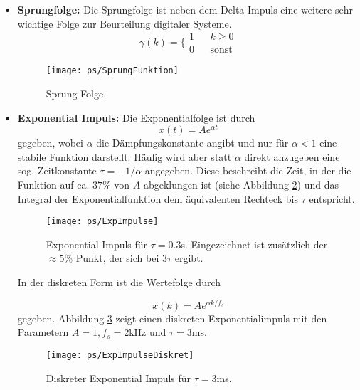 \begin{itemize}
{}
\item{{\bf Sprungfolge:} Die Sprungfolge ist neben dem Delta-Impuls eine weitere sehr wichtige
    Folge zur Beurteilung digitaler Systeme.
    \begin{equation}\label{eq:Def:Sprungfolge}
        \gamma(k) = \bigg\{ \begin{array}{lcc}
        1 & & k \geq 0\\
        0 & & \mbox{sonst}
        \end{array}
    \end{equation}
\begin{figure}[h]
\begin{center}
\texttt{[image: ps/SprungFunktion]}
\caption{\label{pic:SprungFunktion} Sprung-Folge.}
\end{center}
\end{figure}
}
\item{{\bf Exponential Impuls:} Die Exponentialfolge ist durch
    \begin{equation}
        x(t) = A e^{\alpha t}
    \end{equation}
    gegeben, wobei $\alpha$ die Dämpfungskonstante angibt und nur für $\alpha < 1$ eine stabile Funktion darstellt.
    Häufig wird aber statt $\alpha$ direkt anzugeben eine sog. Zeitkonstante $\tau = -1 / \alpha$ angegeben.
    Diese beschreibt die Zeit, in der die Funktion auf ca. $37$\% von $A$ abgeklungen ist (siehe
    Abbildung \ref{pic:ExpImpulse}) und das Integral der Exponentialfunktion dem äquivalenten Rechteck bis $\tau$ entspricht.
    \begin{figure}[h]
    \begin{center}
    \texttt{[image: ps/ExpImpulse]}
    \caption{\label{pic:ExpImpulse} Exponential Impuls für $\tau = 0.3$s. Eingezeichnet ist
    zusätzlich der $\approx 5$\% Punkt, der sich bei $3\tau$ ergibt.}
    \end{center}
    \end{figure}
    
    
    In der diskreten Form ist die Wertefolge durch

    \begin{equation}\label{eq:ExpImpulseDiskret}
        x(k) = A e^{\alpha k/f_s}
    \end{equation}
    gegeben. Abbildung \ref{pic:ExpImpulseDiskret} zeigt einen diskreten Exponentialimpuls mit
    den Parametern $A = 1, f_s = 2$kHz und $\tau = 3$ms.

    \begin{figure}[h]
    \begin{center}
    \texttt{[image: ps/ExpImpulseDiskret]}
    \caption{\label{pic:ExpImpulseDiskret} Diskreter Exponential Impuls für
    $\tau = 3$ms.}
    \end{center}
    \end{figure}
    
}
\end{itemize}
